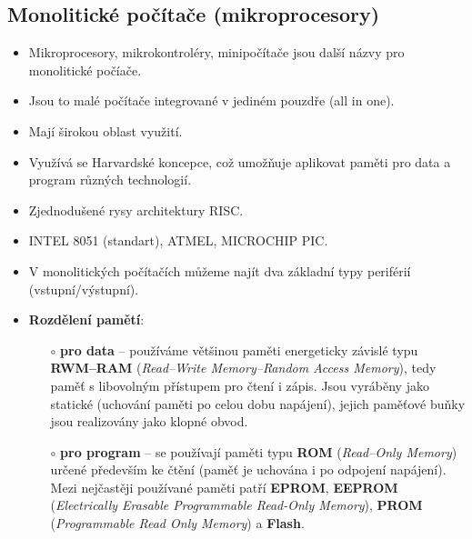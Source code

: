 \subsection*{Monolitické počítače (mikroprocesory)}
\begin{itemize}
\item Mikroprocesory, mikrokontroléry, minipočítače jsou další názvy pro monolitické počíače.
\item Jsou to malé počítače integrované v jediném pouzdře (all in one).
\item Mají širokou oblast využití.
\item Využívá se Harvardské koncepce, což umožňuje aplikovat paměti pro data a program různých technologií.
\item Zjednodušené rysy architektury RISC.
\item INTEL 8051 (standart), ATMEL, MICROCHIP PIC.
\item V monolitických počítačích můžeme najít dva základní typy periférií (vstupní/výstupní).
\item \textbf{Rozdělení pamětí}: 
		\begin{itemize}
				\item[$\circ$]\textbf{pro data} -- používáme většinou paměti energeticky závislé typu \textbf{RWM--RAM} (\textit{Read--Write Memory--Random Access Memory}), tedy paměť s libovolným přístupem pro čtení i zápis. Jsou vyráběny jako statické (uchování paměti po celou dobu napájení), jejich paměťové buňky jsou realizovány jako klopné obvod. 
				\item[$\circ$]\textbf{pro program} -- se používají paměti typu \textbf{ROM} (\textit{Read--Only Memory}) určené především ke čtění (paměť je uchována i po odpojení napájení). Mezi nejčastěji používané paměti patří \textbf{EPROM}, \textbf{EEPROM} (\textit{Electrically Erasable Programmable Read-Only Memory}), \textbf{PROM} (\textit{Programmable Read Only Memory}) a \textbf{Flash}.
		\end{itemize}
\end{itemize}

